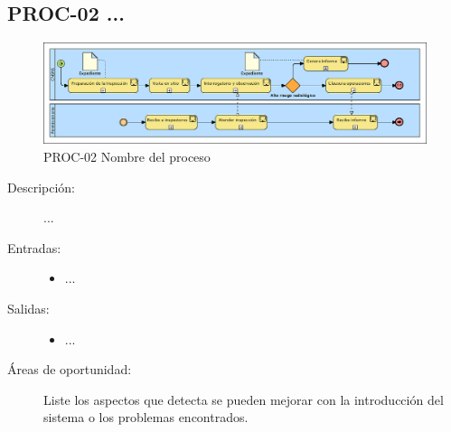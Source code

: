 \subsection{PROC-02 ...}

\begin{figure}[htbp]
	\begin{center}
		\includegraphics[width=.8\textwidth]{images/proceso2}
		\caption{PROC-02 Nombre del proceso}
		\label{fig:proceso2}
	\end{center}
\end{figure}

\begin{description}
	\item[Descripción:] ...
	\item[Entradas:] \cdtEmpty
        \begin{itemize}
			\item ...
        \end{itemize}
	\item[Salidas:] \cdtEmpty
        \begin{itemize}
			\item ...
        \end{itemize}	
    \item[Áreas de oportunidad:] Liste los aspectos que detecta se pueden mejorar con la introducción del sistema o los problemas encontrados.
\end{description}

